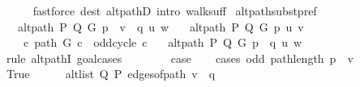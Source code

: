 \begin{isabellebody}
\ \ \ \ \isamarkupfalse%
\ {\isacharparenleft}{\kern0pt}fastforce\ dest{\isacharcolon}{\kern0pt}\ alt{\isacharunderscore}{\kern0pt}pathD{\isacharparenleft}{\kern0pt}{}{\isacharparenright}{\kern0pt}\ intro{\isacharcolon}{\kern0pt}\ walk{\isacharunderscore}{\kern0pt}suff{\isacharparenright}{\kern0pt}\isanewline
{}\isamarkupfalse%
%
\endisatagproof
{\isafoldproof}%
%
\isadelimproof
\isanewline
%
\endisadelimproof
\isanewline
{}\isamarkupfalse%
\ alt{\isacharunderscore}{\kern0pt}path{\isacharunderscore}{\kern0pt}subst{\isacharunderscore}{\kern0pt}pref{\isacharcolon}{\kern0pt}\isanewline
\ \ \ {\isachardoublequoteopen}alt{\isacharunderscore}{\kern0pt}path\ P\ Q\ G\ {\isacharparenleft}{\kern0pt}p\ {\isacharat}{\kern0pt}\ v\ {\isacharhash}{\kern0pt}\ q{\isacharparenright}{\kern0pt}\ u\ w{\isachardoublequoteclose}\isanewline
\ \ \ {\isachardoublequoteopen}alt{\isacharunderscore}{\kern0pt}path\ P\ Q\ G\ p{\isacharprime}{\kern0pt}\ u\ v{\isachardoublequoteclose}\isanewline
\ \ \ {\isachardoublequoteopen}{\isasymnot}\ {\isacharparenleft}{\kern0pt}{\isasymexists}c{\isachardot}{\kern0pt}\ path\ G\ c\ {\isasymand}\ odd{\isacharunderscore}{\kern0pt}cycle\ c{\isacharparenright}{\kern0pt}{\isachardoublequoteclose}\isanewline
\ \ \ {\isachardoublequoteopen}alt{\isacharunderscore}{\kern0pt}path\ P\ Q\ G\ {\isacharparenleft}{\kern0pt}p{\isacharprime}{\kern0pt}\ {\isacharat}{\kern0pt}\ q{\isacharparenright}{\kern0pt}\ u\ w{\isachardoublequoteclose}\isanewline
%
\isadelimproof
%
\endisadelimproof
%
\isatagproof
{}\isamarkupfalse%
\ {\isacharparenleft}{\kern0pt}rule\ alt{\isacharunderscore}{\kern0pt}pathI{\isacharcomma}{\kern0pt}\ goal{\isacharunderscore}{\kern0pt}cases{\isacharparenright}{\kern0pt}\isanewline
\ \ \isamarkupfalse%
\ {}\isanewline
\ \ \isamarkupfalse%
\ {\isacharquery}{\kern0pt}case\isanewline
\ \ \isamarkupfalse%
\ {\isacharparenleft}{\kern0pt}cases\ {\isachardoublequoteopen}odd\ {\isacharparenleft}{\kern0pt}path{\isacharunderscore}{\kern0pt}length\ {\isacharparenleft}{\kern0pt}p\ {\isacharat}{\kern0pt}\ {\isacharbrackleft}{\kern0pt}v{\isacharbrackright}{\kern0pt}{\isacharparenright}{\kern0pt}{\isacharparenright}{\kern0pt}{\isachardoublequoteclose}{\isacharparenright}{\kern0pt}\isanewline
\ \ \ \ \isamarkupfalse%
\ True\isanewline
\ \ \ \ \isamarkupfalse%
\ {\isachardoublequoteopen}alt{\isacharunderscore}{\kern0pt}list\ Q\ P\ {\isacharparenleft}{\kern0pt}edges{\isacharunderscore}{\kern0pt}of{\isacharunderscore}{\kern0pt}path\ {\isacharparenleft}{\kern0pt}v\ {\isacharhash}{\kern0pt}\ q{\isacharparenright}{\kern0pt}{\isacharparenright}{\kern0pt}{\isachardoublequoteclose}\isanewline

\end{isabellebody}
